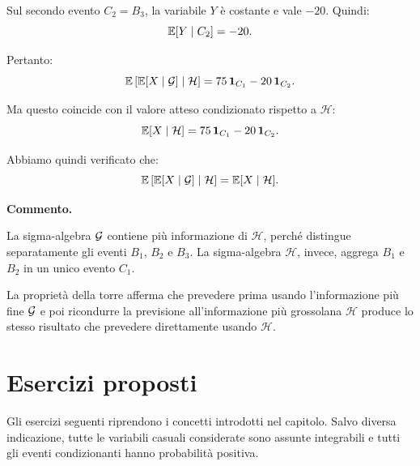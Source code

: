 Sul secondo evento $C_2=B_3$, la variabile $Y$ \`{e} costante e vale $-20$.
Quindi:
\[
\mathbb{E}[Y\mid C_2]
=
-20.
\]

Pertanto:
\[
\mathbb{E}\left[
\mathbb{E}[X\mid\mathcal{G}]
\mid
\mathcal{H}
\right]
=
75\,\mathbf{1}_{C_1}
-
20\,\mathbf{1}_{C_2}.
\]

Ma questo coincide con il valore atteso condizionato rispetto a
$\mathcal{H}$:
\[
\mathbb{E}[X\mid\mathcal{H}]
=
75\,\mathbf{1}_{C_1}
-
20\,\mathbf{1}_{C_2}.
\]

Abbiamo quindi verificato che:
\[
\mathbb{E}\left[
\mathbb{E}[X\mid\mathcal{G}]
\mid
\mathcal{H}
\right]
=
\mathbb{E}[X\mid\mathcal{H}].
\]

\medskip

\noindent
\textbf{Commento.}

La sigma-algebra $\mathcal{G}$ contiene pi\`{u} informazione di
$\mathcal{H}$, perch\'{e} distingue separatamente gli eventi $B_1$, $B_2$ e
$B_3$. La sigma-algebra $\mathcal{H}$, invece, aggrega $B_1$ e $B_2$ in un
unico evento $C_1$.

La propriet\`{a} della torre afferma che prevedere prima usando
l'informazione pi\`{u} fine $\mathcal{G}$ e poi ricondurre la previsione
all'informazione pi\`{u} grossolana $\mathcal{H}$ produce lo stesso risultato
che prevedere direttamente usando $\mathcal{H}$.

\section{Esercizi proposti}

Gli esercizi seguenti riprendono i concetti introdotti nel capitolo. Salvo
diversa indicazione, tutte le variabili casuali considerate sono assunte
integrabili e tutti gli eventi condizionanti hanno probabilit\`{a} positiva.


